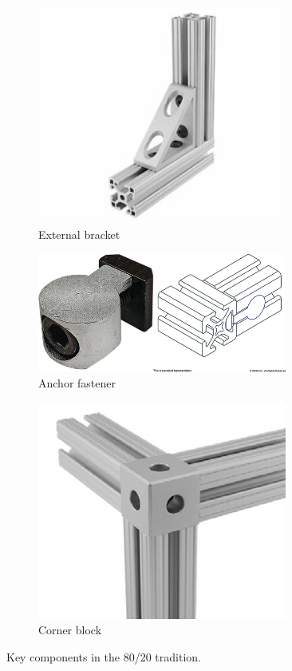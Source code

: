 \documentclass[10pt,letterpaper]{book}
\begin{document}
\begin{figure}[H]
\begin{subfigure}[b]{.32\linewidth}
		\includegraphics[width=0.9\textwidth]{imgs/tradition_8020_ext_bracket.jpeg}
		\caption{External bracket}
	\end{subfigure}
	
	\begin{subfigure}[b]{.55\linewidth}
		\includegraphics[width=0.9\textwidth]{imgs/tradition_8020_anchor.jpeg}
		\caption{Anchor fastener}
	\end{subfigure}\begin{subfigure}[b]{.4\linewidth}
		\includegraphics[width=0.9\textwidth]{imgs/tradition_8020_corner.png}
		\caption{Corner block}
	\end{subfigure}
	\caption{Key components in the 80/20 tradition.}
	\end{figure}
	
\end{document}
